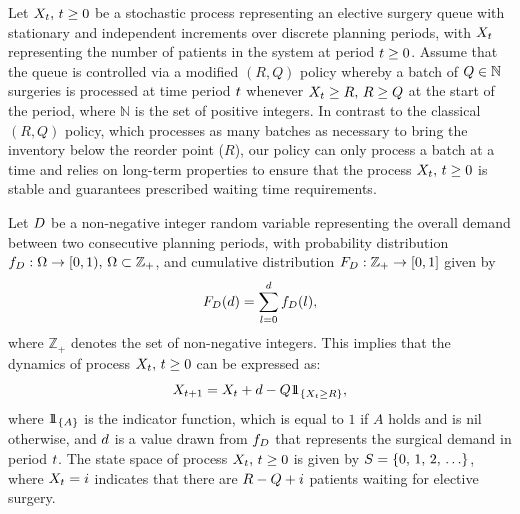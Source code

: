 Let $X_{t}, \, t \ge 0$ be a stochastic process representing an elective surgery queue with stationary and independent increments over discrete planning periods, with $X_{t}$ representing the number of patients in the system at period $t \ge 0$. Assume that the queue is controlled via a modified $(R,Q)$ policy \citep[e.g.,][]{Axsater2015Inv} whereby a batch of $Q \in \mathbb N$ surgeries is processed at time period $t$ whenever $X_{t} \ge R, \, R \ge Q$ at the start of the period, where $\mathbb N$ is the set of positive integers. In contrast to the classical $(R,Q)$ policy, which processes as many batches as necessary to bring the inventory below the reorder point ($R$), our policy can only process a batch at a time and relies on long-term properties to ensure that the process $X_{t}, \, t \ge 0$ is stable and guarantees prescribed waiting time requirements.

Let $D$ be a non-negative integer random variable representing the overall demand between two consecutive planning periods, with probability distribution $f_{D}: \Omega \to [0,1), \, \Omega \subset \mathbb Z_+$, and cumulative distribution $F_{D}: \mathbb Z_+ \to [0,1]$ given by
%
\[
F_{D}(d) = \sum_{l=0}^{d} f_{D}(l),
\]
%
where $\mathbb Z_+$ denotes the set of non-negative integers. This implies that the dynamics of process $X_{t}, \, t \ge 0$ can be expressed as:
%
\begin{equation} \label{eq:dynamics}
X_{t+1} = X_{t} + d - Q {1\kern-.3468em{ 1}}_{\{X_{t} \ge R\}},
\end{equation}
%
where ${1\kern-.3468em{ 1}}_{\{A\}}$ is the indicator function, which is equal to $1$ if $A$ holds and is nil otherwise, and $d$ is a value drawn from $f_{D}$ that represents the surgical demand in period $t$. The state space of process $X_{t}, \, t \ge 0$ is given by $S = \{ 0, \, 1 , \, 2, \, \ldots \}$, where $X_{t}=i$ indicates that there are $R-Q + i$ patients waiting for elective surgery.

